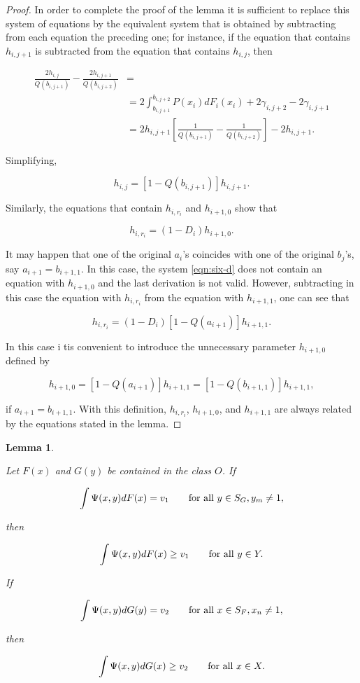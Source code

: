 \documentclass{article}
\newtheorem{lemma}{Lemma}
\begin{document}
\begin{proof}
In order to complete the proof of the lemma it is sufficient to replace this
system of equations by the equivalent system that is obtained by subtracting
from each equation the preceding one; for instance, if the equation that
contains $h_{i, j+1}$ is subtracted from the equation that contains $h_{i,j}$,
then

\[
\begin{aligned}
\frac{2h_{i,j}}{Q(b_{i, j+1})}
- \frac{2h_{i,j+1}}{Q(b_{i, j+2})}
&= \\
&= 2 \int_{b_{i, j+1}}^{b_{i, j+2}} P(x_i)dF_i(x_i) + 2\gamma_{i, j+2} -
2\gamma_{i, j+1} \\
&= 2h_{i, j+1} \left [
    \frac{1}{Q(b_{i, j+1})} - \frac{1}{Q(b_{i, j+2})}
\right ] - 2h_{i, j+1}.
\end{aligned}
\]

Simplifying,

\[
h_{i,j} = [1 - Q(b_{i, j+1})] h_{i, j+1}.
\]

Similarly, the equations that contain $h_{i, r_i}$ and $h_{i+1, 0}$ show that

\[
h_{i, r_i} = (1 - D_i) h_{i+1, 0}.
\]

It may happen that one of the original $a_i$'s coincides with one of the
original $b_j$'s, say $a_{i+1} = b_{i+1, 1}$. In this case, the system
\ref{eqn:six-d} does not contain an equation with $h_{i+1, 0}$ and the last
derivation is not valid. However, subtracting in this case the equation with
$h_{i, r_i}$ from the equation with $h_{i+1, 1}$, one can see that

\[
h_{i, r_i} = (1 - D_i)[1 - Q(a_{i+1})] h_{i+1, 1}.
\]

In this case i tis convenient to introduce the unnecessary parameter $h_{i+1,
0}$ defined by

\[
h_{i+1, 0} = [1 - Q(a_{i+1})]h_{i+1, 1} = [1-Q(b_{i+1, 1})]h_{i+1, 1},
\]

if $a_{i+1} = b_{i+1, 1}$. With this definition, $h_{i, r_i}$, $h_{i+1, 0}$,
and $h_{i+1, 1}$ are always related by the equations stated in the lemma.

\end{proof}


\begin{lemma} \label{lemma:value-of-the-game}

Let $F(x)$ and $G(y)$ be contained in the class $O$. If

\[
\int \Psi(x, y) dF(x) = v_1 \qquad \textup{for all } y \in S_G, y_m \neq 1,
\]

then

\[
\int \Psi(x, y) dF(x) \geq v_1 \qquad \textup{for all } y \in Y.
\]

If

\[
\int \Psi(x, y) dG(y) = v_2 \qquad \textup{for all } x \in S_F, x_n \neq 1,
\]

then

\[
\int \Psi(x, y) dG(x) \geq v_2 \qquad \textup{for all } x \in X.
\]

\end{lemma}
\end{document}

